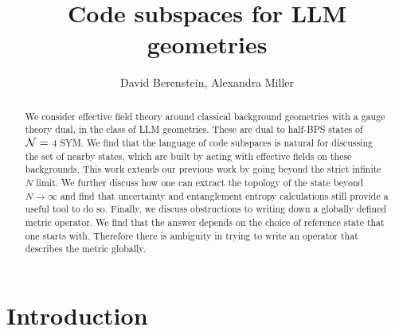 \documentclass[12pt,nofootinbib, longbibliography]{revtex4-1}
\begin{document}
\setlength{\unitlength}{1mm}
\title{Code subspaces for LLM geometries}

\author{David Berenstein, Alexandra Miller}


\begin{abstract} 
We consider effective field theory around  classical background geometries with a gauge theory dual, in the class  of LLM geometries. These  are dual to half-BPS states of $\cal{N}=$ 4 SYM. We find that the language of code subspaces is natural for discussing the set of nearby states, which are built by acting with effective fields on these backgrounds. This work extends our previous work by going beyond the strict infinite $N$ limit. We further discuss how one can extract the topology of the state beyond $N\rightarrow\infty$ and find that uncertainty and entanglement entropy calculations still provide a useful tool to do so. Finally, we discuss obstructions to writing down a globally defined metric operator. We find that the answer depends on the choice of reference state that  one starts with. Therefore there is ambiguity in trying to write an operator that describes the metric globally.

 \end{abstract}

\maketitle



\section{Introduction }
\label{S:Introduction}
\end{document}
